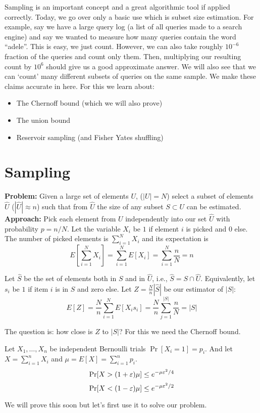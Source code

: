 \documentclass{article}
\begin{document}

Sampling is an important concept and a great algorithmic tool if applied correctly.
Today, we go over only a basic use which is subset size estimation.
For example, say we have a large query log (a list of all queries made to a search engine)
and say we wanted to measure how many queries contain the word ``adele''.
This is easy, we just count. 
However, we can also take roughly $10^{-6}$ fraction of the queries and count only them.
Then, multiplying our resulting count by $10^{6}$ should give us a good approximate answer.
We will also see that we can `count' many different subsets of queries on the same sample.
We make these claims accurate in here.
For this we learn about:
\begin{itemize}
\item The Chernoff bound (which we will also prove)
\item The union bound 
\item Reservoir sampling (and Fisher Yates shuffling)
\end{itemize}

\section{Sampling}

{\bf Problem:} Given a large set of elements $U$, ($|U|=N$) select a subset of elements 
$\hat{U}$ ($|\hat{U}| \approx n$) such that from 
$\hat{U}$ the size of any subset $S \subset U$ can be estimated.\\
{\bf Approach:} Pick each element from $U$ independently into our set $\hat{U}$ with probability $p = n/N$.
Let the variable $X_i$ be $1$ if element $i$ is picked and $0$ else.
The number of picked elements is $\sum_{i=1}^{N} X_i$ and its expectation is 
$$E[\sum_{i=1}^{N} X_i] = \sum_{i=1}^{N}E[X_i] = \sum_{i=1}^{N}\frac{n}{N} = n$$

Let $\hat{S}$ be the set of elements both in $S$ and in $\hat{U}$, i.e., $\hat{S} =  S \cap \hat{U}$. 
Equivalently, let $s_i$ be $1$ if item $i$ is in $S$ and zero else. 
Let $Z = \frac{N}{n}|\hat{S}|$ be our estimator of $|S|$:
\[
E[Z] = \frac{N}{n}\sum_{i=1}^{N}E[X_i s_i] = \frac{N}{n}\sum_{j=1}^{|S|} \frac{n}{N} =  |S|
\]

\noindent The question is: how close is $Z$ to $|S|$? For this we need the Chernoff bound.

\begin{lemma}
Let $X_1,\ldots,X_n$ be independent Bernoulli trials $\Pr[X_i=1] = p_i$. 
And let $X = \sum_{i=1}^{n}X_i$ and $\mu = E[X] = \sum_{i=1}^{n}p_i$.
\begin{equation}
\Pr[X > (1 + \varepsilon)\mu] \le e^{-\mu \varepsilon^2/4}
\end{equation} 
\begin{equation}
\Pr[X < (1 - \varepsilon)\mu] \le e^{-\mu \varepsilon^2/2}
\end{equation} 
\end{lemma}
We will prove this soon but let's first use it to solve our problem.
\end{document}
